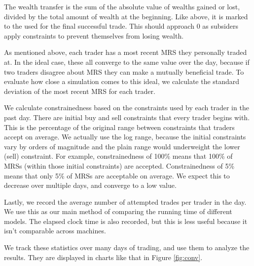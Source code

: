 \documentclass[12pt,a4paper,titlepage]{article}
\begin{document}
The wealth transfer is the sum of the absolute value of wealths gained or lost, divided by the total amount of wealth at the beginning.
Like above, it is marked to the used for the final successful trade.
This should approach 0 as subsiders apply constraints to prevent themselves from losing wealth.

As mentioned above, each trader has a most recent MRS they personally traded at.
In the ideal case, these all converge to the same value over the day, because if two traders disagree about MRS they can make a mutually beneficial trade.
To evaluate how close a simulation comes to this ideal, we calculate the standard deviation of the most recent MRS for each trader.

    
We calculate constrainedness based on the constraints used by each trader in the past day.
There are initial buy and sell constraints that every trader begins with.
This is the percentage of the original range between constraints that traders accept on average.
We actually use the log range, because the initial constraints vary by orders of magnitude and the plain range would underweight the lower (sell) constraint.
For example, constrainedness of 100\% means that 100\% of MRSs (within those initial constraints) are accepted.
Constrainedness of 5\% means that only 5\% of MRSs are acceptable on average.
We expect this to decrease over multiple days, and converge to a low value.

Lastly, we record the average number of attempted trades per trader in the day.
We use this as our main method of comparing the running time of different models.
The elapsed clock time is also recorded, but this is less useful because it isn't comparable across machines.


We track these statistics over many days of trading, and use them to analyze the results.
They are displayed in charts like that in Figure \ref{fig:conv}.
\end{document}

